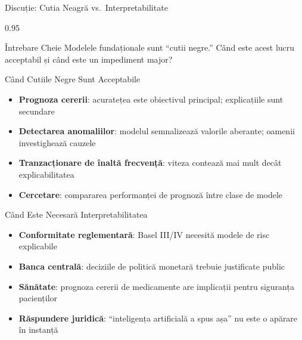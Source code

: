 \documentclass[9pt, aspectratio=169, t]{beamer}
\begin{document}
\begin{frame}{Discuție: Cutia Neagră vs.\ Interpretabilitate}
    \begin{cminipage}{0.95\textwidth}
    {\footnotesize
    \begin{alertblock}{Întrebare Cheie}
        Modelele fundaționale sunt ``cutii negre.'' Când este acest lucru acceptabil și când este un impediment major?
    \end{alertblock}
    \begin{block}{Când Cutiile Negre Sunt Acceptabile}
        \begin{itemize}\setlength{\itemsep}{0pt}
            \item \textbf{Prognoza cererii}: acuratețea este obiectivul principal; explicațiile sunt secundare
            \item \textbf{Detectarea anomaliilor}: modelul semnalizează valorile aberante; oamenii investighează cauzele
            \item \textbf{Tranzacționare de înaltă frecvență}: viteza contează mai mult decât explicabilitatea
            \item \textbf{Cercetare}: compararea performanței de prognoză între clase de modele
        \end{itemize}
    \end{block}
    \begin{exampleblock}{Când Este Necesară Interpretabilitatea}
        \begin{itemize}\setlength{\itemsep}{0pt}
            \item \textbf{Conformitate reglementară}: Basel III/IV necesită modele de risc explicabile
            \item \textbf{Banca centrală}: deciziile de politică monetară trebuie justificate public
            \item \textbf{Sănătate}: prognoza cererii de medicamente are implicații pentru siguranța pacienților
            \item \textbf{Răspundere juridică}: ``inteligența artificială a spus așa'' nu este o apărare în instanță
        \end{itemize}
    \end{exampleblock}
    }
    \end{cminipage}
\end{frame}
\end{document}
